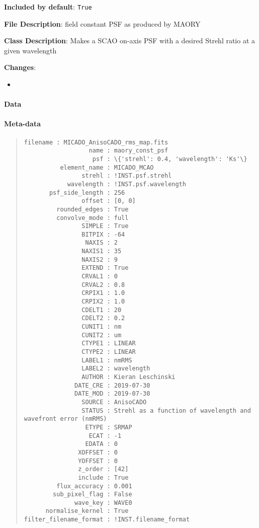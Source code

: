 \textbf{Included by default}: \texttt{True}

\textbf{File Description}: field constant PSF as produced by MAORY

\textbf{Class Description}: Makes a SCAO on-axis PSF with a desired Strehl ratio at a given wavelength

\textbf{Changes}:

\begin{itemize}
\item \end{itemize}


\paragraph{Data%
  \label{id1}%
}


\paragraph{Meta-data%
  \label{id2}%
}

\begin{quote}
\begin{alltt}
\begin{lstlisting}[frame=single]
              filename : MICADO_AnisoCADO_rms_map.fits
                  name : maory_const_psf
                   psf : \{'strehl': 0.4, 'wavelength': 'Ks'\}
          element_name : MICADO_MCAO
                strehl : !INST.psf.strehl
            wavelength : !INST.psf.wavelength
       psf_side_length : 256
                offset : [0, 0]
         rounded_edges : True
         convolve_mode : full
                SIMPLE : True
                BITPIX : -64
                 NAXIS : 2
                NAXIS1 : 35
                NAXIS2 : 9
                EXTEND : True
                CRVAL1 : 0
                CRVAL2 : 0.8
                CRPIX1 : 1.0
                CRPIX2 : 1.0
                CDELT1 : 20
                CDELT2 : 0.2
                CUNIT1 : nm
                CUNIT2 : um
                CTYPE1 : LINEAR
                CTYPE2 : LINEAR
                LABEL1 : nmRMS
                LABEL2 : wavelength
                AUTHOR : Kieran Leschinski
              DATE_CRE : 2019-07-30
              DATE_MOD : 2019-07-30
                SOURCE : AnisoCADO
                STATUS : Strehl as a function of wavelength and wavefront error (nmRMS)
                 ETYPE : SRMAP
                  ECAT : -1
                 EDATA : 0
               XOFFSET : 0
               YOFFSET : 0
               z_order : [42]
               include : True
         flux_accuracy : 0.001
        sub_pixel_flag : False
              wave_key : WAVE0
      normalise_kernel : True
filter_filename_format : !INST.filename_format
\end{lstlisting}
\end{alltt}
\end{quote}
